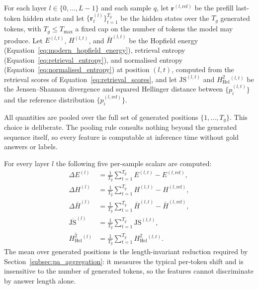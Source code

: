 For each layer $l \in \{0, \ldots, L-1\}$ and each sample $q$, let
$\mathbf{r}^{(l,\mathrm{ref})}$ be the prefill last-token hidden state and
let $\{\mathbf{r}_t^{(l)}\}_{t=1}^{T_g}$ be the hidden states over the
$T_g$ generated tokens, with $T_g \le T_{\max}$ a fixed cap on the number
of tokens the model may produce.  Let $E^{(l,t)}$, $H^{(l,t)}$, and
$\bar{H}^{(l,t)}$ be the Hopfield energy
(Equation~\eqref{eq:modern_hopfield_energy}), retrieval entropy
(Equation~\eqref{eq:retrieval_entropy}), and normalised entropy
(Equation~\eqref{eq:normalised_entropy}) at position $(l,t)$, computed from
the retrieval scores of Equation~\eqref{eq:retrieval_scores}, and let
$\mathrm{JS}^{(l,t)}$ and $H^2_{\mathrm{Hel}}{}^{(l,t)}$ be the
Jensen--Shannon divergence and squared Hellinger distance between
$\{p_i^{(l,t)}\}$ and the reference distribution
$\{p_i^{(l,\mathrm{ref})}\}$.

All quantities are pooled over the full set of generated positions
$\{1, \ldots, T_g\}$. This choice is deliberate. The pooling rule consults
nothing beyond the generated sequence itself, so every feature is
computable at inference time without gold answers or labels.

For every layer $l$ the following five per-sample scalars are computed:
\begin{align}
    \Delta E^{(l)}
        &= \frac{1}{T_g} \sum_{t=1}^{T_g} E^{(l,t)}
           - E^{(l,\mathrm{ref})},
    \label{eq:delta_energy} \\[4pt]
    \Delta H^{(l)}
        &= \frac{1}{T_g} \sum_{t=1}^{T_g} H^{(l,t)}
           - H^{(l,\mathrm{ref})},
    \label{eq:delta_entropy} \\[4pt]
    \Delta \bar{H}^{(l)}
        &= \frac{1}{T_g} \sum_{t=1}^{T_g} \bar{H}^{(l,t)}
           - \bar{H}^{(l,\mathrm{ref})},
    \label{eq:delta_norm_entropy} \\[4pt]
    \overline{\mathrm{JS}}^{(l)}
        &= \frac{1}{T_g} \sum_{t=1}^{T_g} \mathrm{JS}^{(l,t)},
    \label{eq:mean_js} \\[4pt]
    \overline{H^2_{\mathrm{Hel}}}{}^{(l)}
        &= \frac{1}{T_g} \sum_{t=1}^{T_g} H^2_{\mathrm{Hel}}{}^{(l,t)}.
    \label{eq:mean_hellinger}
\end{align}
The mean over generated positions is the length-invariant reduction
required by Section~\ref{subsec:pa_aggregation}: it measures the typical
per-token shift and is insensitive to the number of generated tokens, so
the features cannot discriminate by answer length alone.

